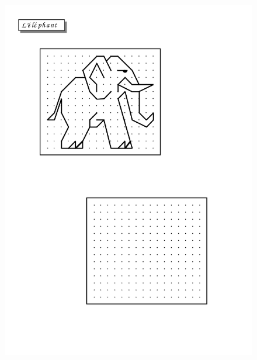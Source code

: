 \begin{figure}[H]
  \centering
  \includegraphics[width=\linewidth]{sources/pages/1.1.1/4-elephant.pdf}
  \caption{\label{ours}}
\end{figure}


